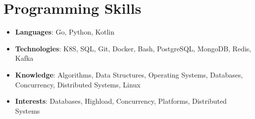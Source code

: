 \documentclass[letterpaper,10pt]{article}
\newcommand{\resumeSubHeadingListStart}{\begin{itemize}[leftmargin=*]}
\newcommand{\resumeSubHeadingListEnd}{\end{itemize}}
\begin{document}
\section{Programming Skills}
\resumeSubHeadingListStart
\item{
\small{
\textbf{Languages}{: Go, Python, Kotlin }
}
}\vspace{-7pt}
\item{
\small{
\textbf{Technologies}{: K8S, SQL, Git, Docker, Bash, PostgreSQL, MongoDB, Redis, Kafka }
}
}
\vspace{-7pt}
\item{
\small{
\textbf{Knowledge}{: Algorithms, Data Structures, Operating Systems, Databases, Concurrency, Distributed Systems, Linux }
}
}
\vspace{-7pt}
\item{
\small{
\textbf{Interests}{: Databases, Highload, Concurrency, Platforms, Distributed Systems }
}
}


\resumeSubHeadingListEnd
\end{document}
